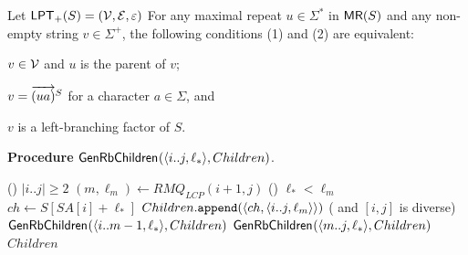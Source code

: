 \documentclass{article}
\begin{document}
\begin{lemma}\label{lem:maxrep:howto:child}
  Let $\mathsf{LPT}_{+}(S) = (\mathcal{V}, \mathcal{E}, \varepsilon)$
  For any maximal repeat $u \in \Sigma^*$ in $\textsf{MR}(S)$ and any non-empty string $v \in \Sigma^+$, the following conditions (1) and (2) are equivalent: 
\begin{enumerate*}[(1)]
\item $v \in \mathcal{V}$ and $u$ is the parent of $v$;  
\item
  \begin{enumerate*}[(i)]
  \item $v = \overrightarrow{(ua)}^{S}$ for a character $a\in \Sigma$, and 
  \item $v$ is a left-branching factor of $S$. 
  \end{enumerate*}
\end{enumerate*}
\end{lemma}

{
\setlength{\algotitleheightrule}{0pt}%
\begin{algorithm}[h]
  \caption{
    \textbf{Procedure} $\textsf{GenRbChildren}_{}(\langle i..j, \ell_*\rangle, Children)$.  
  }\label{algo:genchildren}
      \If  ()
           {$|i..j| \ge 2$}
      {
        $(m, \ell_m) \gets RMQ_{LCP}(i+1, j)$
        \uIf () {$\ell_* < \ell_m$}{
          $ch \gets S[SA[i]+\ell_*]$
          \label{line:genchildren:compute:ch}
          $Children.\mathtt{append}(\langle ch, \langle i..j, \ell_m\rangle\rangle)$
        }
        \Else  ( and $[i,j]$ is diverse) 
        {
          $\textsf{GenRbChildren}_{}(\langle i..m-1, \ell_*\rangle, Children)$\; 
          $\textsf{GenRbChildren}_{}(\langle m..j, \ell_*\rangle, Children)$\;
        }
      }
      \Return $Children$\;
\end{algorithm}
}
\end{document}
